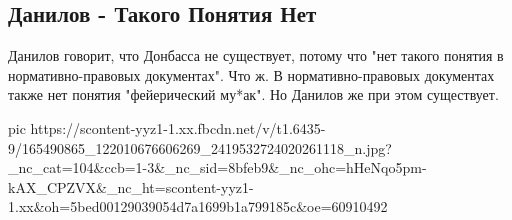  
 
 
 
 

\subsection{Данилов - Такого Понятия Нет}
\label{sec:25_03_2021.fb.zharkih_ekaterina.1.danilov_mudak}

Данилов говорит, что Донбасса не существует, потому что "нет такого понятия в
нормативно-правовых документах". Что ж. В нормативно-правовых документах также
нет понятия "фейерический му*ак". Но Данилов же при этом существует.

\ifcmt
  pic https://scontent-yyz1-1.xx.fbcdn.net/v/t1.6435-9/165490865_122010676606269_2419532724020261118_n.jpg?_nc_cat=104&ccb=1-3&_nc_sid=8bfeb9&_nc_ohc=hHeNqo5pm-kAX_CPZVX&_nc_ht=scontent-yyz1-1.xx&oh=5bed00129039054d7a1699b1a799185c&oe=60910492
\fi


